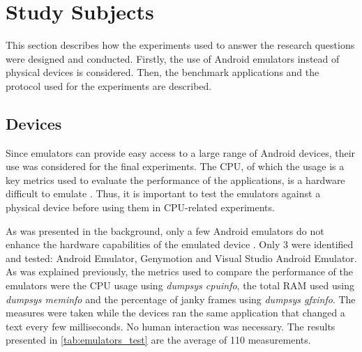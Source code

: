 \documentclass{kththesis}
\begin{document}
\section{Study Subjects}

This section describes how the experiments used to answer the research questions were designed and conducted. Firstly, the use of Android emulators instead of physical devices is considered. Then, the benchmark applications and the protocol used for the experiments are described.

\subsection{Devices}
\label{method:emulators}

Since emulators can provide easy access to a large range of Android devices, their use was considered for the final experiments. The CPU, of which the usage is a key metrics used to evaluate the performance of the applications, is a hardware difficult to emulate \cite{cpu_emulator}. Thus, it is important to test the emulators against a physical device before using them in CPU-related experiments.

As was presented in the background, only a few Android emulators do not enhance the hardware capabilities of the emulated device . Only 3 were identified and tested: Android Emulator, Genymotion and Visual Studio Android Emulator. As was explained previously, the metrics used to compare the performance of the emulators were the CPU usage using \textit{dumpsys cpuinfo}, the total RAM used using \textit{dumpsys meminfo} and the percentage of janky frames using \textit{dumpsys gfxinfo}. The measures were taken while the devices ran the same application that changed a text every few milliseconds. No human interaction was necessary. The results presented in \autoref{tab:emulators_test} are the average of 110 measurements.

\begin{table}[!ht]
    \caption{Emulators Tests}
    \label{tab:emulators_test}
\end{table}
\end{document}
